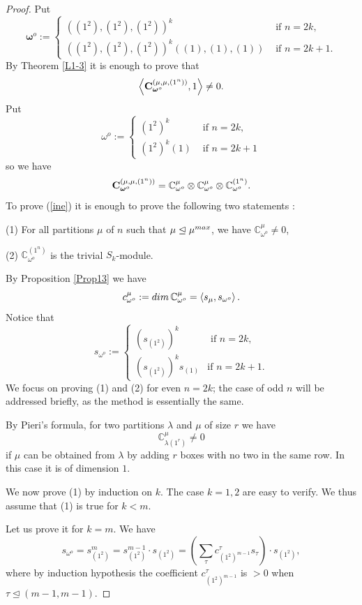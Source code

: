 \documentclass[11pt]{article}
\theoremstyle{definition}
\numberwithin{equation}{section}
\newcommand{\C}{{\bf C}}
\newcommand{\omegahat}{{\boldsymbol \omega}}
\begin{document}
\begin{proof} Put 
	$$
	\omegahat^o:=\begin{cases}((1^2),(1^2),(1^2))^k&\text{ if } n=2k,\\
		((1^2),(1^2),(1^2))^k((1),(1),(1))&\text{ if }n=2k+1.\end{cases}
	$$
	By Theorem \ref{L1-3} it is enough to prove that
	\begin{equation}
		\left\langle \C_{\omegahat^o}^{(\mu,\mu,(1^n))},1\right\rangle\neq 0.
		\label{ine}\end{equation}
	Put
	$$
	\omega^o:=\begin{cases}(1^2)^k&\text{ if } n=2k,\\
		(1^2)^k(1)&\text{ if }n=2k+1\end{cases}
	$$
	so we have
	$$
	\C_{\omegahat^o}^{(\mu,\mu,(1^n))}=\mathbb{C}_{\omega^o}^\mu\otimes\mathbb{C}_{\omega^o}^\mu\otimes\mathbb{C}_{\omega^o}^{(1^n)}.
	$$
	To prove (\ref{ine}) it is enough to prove the following two statements :
	
	(1) For all partitions $\mu$ of $n$ such that $\mu\trianglelefteq \mu^{\rm max}$, we have $\mathbb{C}_{\omega^o}^\mu\neq 0$,
	
	(2) $\mathbb{C}_{\omega^o}^{(1^n)}$ is the trivial $S_k$-module.
	
	
	
	By Proposition \ref{Prop13} we have
	$$
	c_{\omega^o}^\mu:={\rm dim}\, \mathbb{C}_{\omega^o}^\mu=\left\langle s_\mu,s_{\omega^o}\right\rangle.
	$$
	Notice that
	$$
	s_{\omega^o}:=\begin{cases}(s_{(1^2)})^k&\text{ if }n=2k,\\
		(s_{(1^2)})^k s_{(1)}&\text{if }n=2k+1.\end{cases}
	$$
	We focus on proving (1) and (2) for even \(n = 2k\); the case of odd \(n\) will be addressed briefly, as the method is essentially the same.
	
	
	By Pieri's formula, for two partitions $\lambda$ and $\mu$ of size $r$ we have
	$$
	\mathbb{C}^\mu_{\lambda (1^r)}\neq 0
	$$
	if $\mu$ can be obtained from $\lambda$ by adding $r$ boxes with no two in the same row. In this case it is of dimension $1$. 
	
	
	
	We now prove (1) by induction on $k$. The case $k=1, 2$ are easy to verify. We thus assume that (1) is true for $k<m$.
	
	Let us prove it for $k=m$. We have
	$$
	s_{\omega^o}=s_{(1^2)}^m=s_{(1^2)}^{m-1}\cdot s_{(1^2)}=\left(\sum_{\tau}c_{(1^2)^{m-1}}^\tau s_\tau\right)\cdot s_{(1^2)},
	$$
	where by induction hypothesis the coefficient $c_{(1^2)^{m-1}}^\tau$ is $> 0$ when $\tau\trianglelefteq (m-1,m-1)$.
	

\end{proof}
\end{document}
